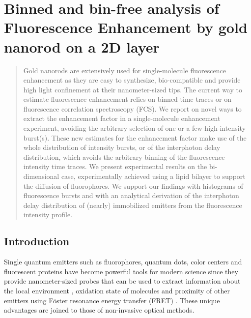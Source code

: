 \chapter{Binned and bin-free analysis of Fluorescence Enhancement by gold nanorod on a 2D layer}
\label{chapter:binfree}
\graphicspath{{./chapters/c3_binfree/figures/}}

\begin{abstract}
Gold nanorods are extensively used for single-molecule fluorescence enhancement as they are easy to synthesize, bio-compatible and provide high light confinement at their nanometer-sized tips. The current way to estimate fluorescence enhancement relies on binned time traces or on fluorescence correlation spectroscopy (FCS). We report on novel ways to extract the enhancement factor in a single-molecule enhancement experiment, avoiding the arbitrary selection of one or a few high-intensity burst(s). These new estimates for the enhancement factor make use of the whole distribution of intensity bursts, or of the interphoton delay distribution, which avoids the arbitrary binning of the fluorescence intensity time traces. We present experimental results on the bi-dimensional case, experimentally achieved using a lipid bilayer to support the diffusion of fluorophores.  We support our findings with histograms of fluorescence bursts and with an analytical derivation of the interphoton delay distribution of (nearly) immobilized emitters from the fluorescence intensity profile.
\end{abstract}
\newpage
\section{Introduction}
Single quantum emitters such as fluorophores, quantum dots, color centers 
and fluorescent proteins have become powerful tools for modern science 
since they provide nanometer-sized probes that can be used to extract 
information about the local environment \cite{moerner1999illuminating, kulzer2010single}, 
oxidation state of molecules \cite{zhang2017gold} and proximity of other 
emitters using F\"oster resonance energy transfer (FRET) \cite{jares2003fret,stein2011single,kalinin2012toolkit}. 
These unique advantages are joined to those of non-invasive optical methods. 

